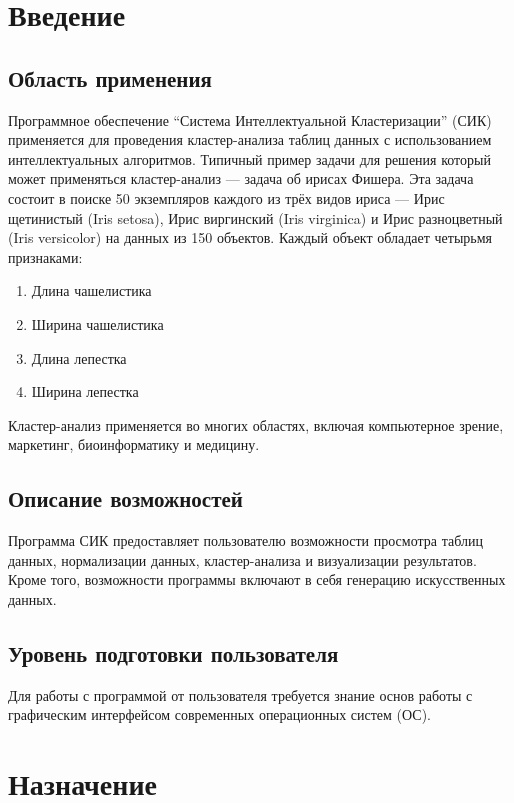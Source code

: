 \documentclass[12pt,twoside,a4paper,tikz,border=5]{refart}
\begin{document}
\tableofcontents 

\newpage
\section{Введение}
\subsection{Область применения} 

Программное обеспечение ``Система Интеллектуальной Кластеризации'' (СИК) применяется для проведения кластер-анализа таблиц данных с использованием интеллектуальных алгоритмов. Типичный пример задачи для решения который может применяться кластер-анализ --- задача об ирисах Фишера. Эта задача состоит в поиске 50 экземпляров каждого из трёх видов ириса --- Ирис щетинистый (Iris setosa), Ирис виргинский (Iris virginica) и Ирис разноцветный (Iris versicolor) на данных из 150 объектов. Каждый объект обладает четырьмя признаками: 
\begin{enumerate}
	\item Длина чашелистика
	\item Ширина чашелистика
	\item Длина лепестка
	\item Ширина лепестка
\end{enumerate}
Кластер-анализ применяется во многих областях, включая компьютерное зрение, маркетинг, биоинформатику и медицину\cite{amorim}.


\subsection{Описание возможностей} 
Программа СИК предоставляет пользователю возможности просмотра таблиц данных, нормализации данных, кластер-анализа и визуализации результатов. Кроме того, возможности программы включают в себя генерацию искусственных данных. 

\subsection{Уровень подготовки пользователя}
Для работы с программой от пользователя требуется знание основ работы с графическим интерфейсом современных операционных систем (ОС).

\section{Назначение}
\end{document}
